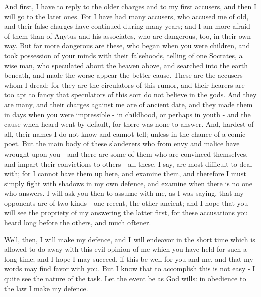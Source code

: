 And first, I have to reply to the older charges and to my first accusers,
and then I will go to the later ones. For I have had many accusers,
who accused me of old, and their false charges have continued during
many years; and I am more afraid of them than of Anytus and his associates,
who are dangerous, too, in their own way. But far more dangerous are
these, who began when you were children, and took possession of your
minds with their falsehoods, telling of one Socrates, a wise man,
who speculated about the heaven above, and searched into the earth
beneath, and made the worse appear the better cause. These are the
accusers whom I dread; for they are the circulators of this rumor,
and their hearers are too apt to fancy that speculators of this sort
do not believe in the gods. And they are many, and their charges against
me are of ancient date, and they made them in days when you were impressible
- in childhood, or perhaps in youth - and the cause when heard went
by default, for there was none to answer. And, hardest of all, their
names I do not know and cannot tell; unless in the chance of a comic
poet. But the main body of these slanderers who from envy and malice
have wrought upon you - and there are some of them who are convinced
themselves, and impart their convictions to others - all these, I
say, are most difficult to deal with; for I cannot have them up here,
and examine them, and therefore I must simply fight with shadows in
my own defence, and examine when there is no one who answers. I will
ask you then to assume with me, as I was saying, that my opponents
are of two kinds - one recent, the other ancient; and I hope that
you will see the propriety of my answering the latter first, for these
accusations you heard long before the others, and much oftener.

Well, then, I will make my defence, and I will endeavor in the short
time which is allowed to do away with this evil opinion of me which
you have held for such a long time; and I hope I may succeed, if this
be well for you and me, and that my words may find favor with you.
But I know that to accomplish this is not easy - I quite see the nature
of the task. Let the event be as God wills: in obedience to the law
I make my defence. 

